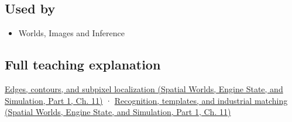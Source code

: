 \subsection{Used by}\label{appendix-a5b0383b3b3e-used-by}

\hypertarget{appendix-a5b0383b3b3e-used-by}{}

\begin{itemize}
\tightlist
\item
  {Worlds, Images and Inference}
\end{itemize}

\subsection{Full teaching explanation}\label{appendix-a5b0383b3b3e-full-teaching-explanation}

\hypertarget{appendix-a5b0383b3b3e-full-teaching-explanation}{}

\href{../05-Spatial-Worlds-Engine-State-and-Simulation-P01/main.pdf\#nameddest=04-visual-computing-ii-ch030-edges-contours-and-subpixel-localization}{Edges, contours, and subpixel localization (Spatial Worlds, Engine State, and Simulation, Part 1, Ch. 11)} · \href{../05-Spatial-Worlds-Engine-State-and-Simulation-P01/main.pdf\#nameddest=04-visual-computing-ii-ch030-recognition-templates-and-industrial-matching}{Recognition, templates, and industrial matching (Spatial Worlds, Engine State, and Simulation, Part 1, Ch. 11)}
